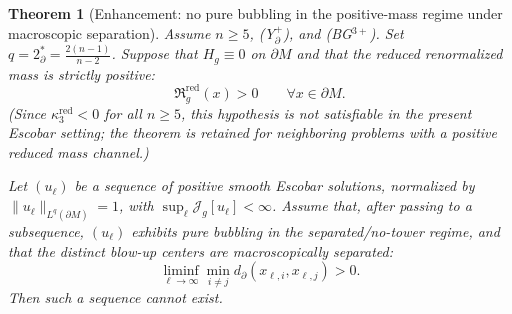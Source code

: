 \documentclass[11pt,reqno,a4paper]{amsart}
\numberwithin{equation}{section}
\theoremstyle{plain}
\newtheorem{theorem}{Theorem}[section]
\theoremstyle{remark}
\theoremstyle{plain}
\begin{document}
\begin{theorem}[Enhancement: no pure bubbling in the positive-mass regime under macroscopic separation]
\label{thm:global-compactness-mass}
Assume $n\ge5$, \textup{(Y$^+_{\partial}$)}, and \textup{(BG$^{3+}$)}.  Set
$q=2^*_{\partial}=\frac{2(n-1)}{n-2}$.  Suppose that $H_g\equiv0$ on $\partial M$ and that the reduced
renormalized mass is strictly positive:
\[
\mathfrak R_g^{\mathrm{red}}(x)>0\qquad\forall x\in\partial M.
\]
\textup{(}Since $\kappa_3^{\mathrm{red}}<0$ for all $n\ge5$, this hypothesis is not satisfiable in the present
Escobar setting; the theorem is retained for neighboring problems with a positive reduced mass channel.\textup{)}

Let $(u_\ell)$ be a sequence of positive smooth Escobar solutions, normalized by
$\|u_\ell\|_{L^q(\partial M)}=1$, with $\sup_\ell\mathcal J_g[u_\ell]<\infty$.
Assume that, after passing to a subsequence, $(u_\ell)$ exhibits pure bubbling in the separated/no-tower regime,
and that the distinct blow-up centers are macroscopically separated:
\begin{equation}\label{eq:macro-sep}
\liminf_{\ell\to\infty}\min_{i\ne j}d_\partial(x_{\ell,i},x_{\ell,j})>0.
\end{equation}
Then such a sequence cannot exist.
\end{theorem}
\end{document}
